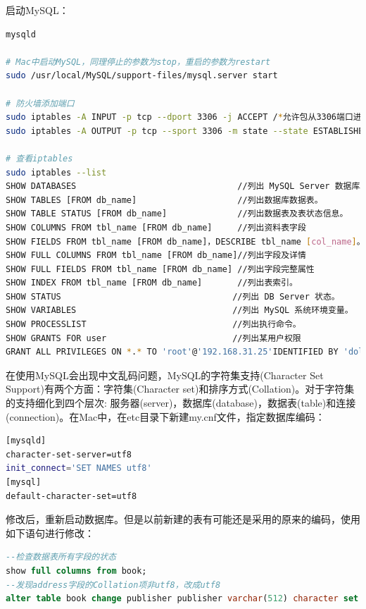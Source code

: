 \documentclass[letter]{book}
\begin{document}
启动MySQL：

\begin{lstlisting}[language=Bash]
mysqld

# Mac中启动MySQL，同理停止的参数为stop，重启的参数为restart
sudo /usr/local/MySQL/support-files/mysql.server start

# 防火墙添加端口
sudo iptables -A INPUT -p tcp --dport 3306 -j ACCEPT /*允许包从3306端口进入*/
sudo iptables -A OUTPUT -p tcp --sport 3306 -m state --state ESTABLISHED -j ACCEPT /*允许从3306端口进入的包返回*/

# 查看iptables
sudo iptables --list
SHOW DATABASES                                //列出 MySQL Server 数据库。
SHOW TABLES [FROM db_name]                    //列出数据库数据表。
SHOW TABLE STATUS [FROM db_name]              //列出数据表及表状态信息。
SHOW COLUMNS FROM tbl_name [FROM db_name]     //列出资料表字段
SHOW FIELDS FROM tbl_name [FROM db_name]，DESCRIBE tbl_name [col_name]。
SHOW FULL COLUMNS FROM tbl_name [FROM db_name]//列出字段及详情
SHOW FULL FIELDS FROM tbl_name [FROM db_name] //列出字段完整属性
SHOW INDEX FROM tbl_name [FROM db_name]       //列出表索引。
SHOW STATUS                                  //列出 DB Server 状态。
SHOW VARIABLES                               //列出 MySQL 系统环境变量。
SHOW PROCESSLIST                             //列出执行命令。
SHOW GRANTS FOR user                         //列出某用户权限
GRANT ALL PRIVILEGES ON *.* TO 'root'@'192.168.31.25'IDENTIFIED BY 'dolphin' WITH GRANT OPTION;
\end{lstlisting}

在使用MySQL会出现中文乱码问题，MySQL的字符集支持(Character Set Support)有两个方面：字符集(Character set)和排序方式(Collation)。对于字符集的支持细化到四个层次: 服务器(server)，数据库(database)，数据表(table)和连接(connection)。在Mac中，在etc目录下新建my.cnf文件，指定数据库编码：

\begin{lstlisting}[language=Bash]
[mysqld]
character-set-server=utf8
init_connect='SET NAMES utf8'
[mysql]
default-character-set=utf8
\end{lstlisting}

修改后，重新启动数据库。但是以前新建的表有可能还是采用的原来的编码，使用如下语句进行修改：

\begin{lstlisting}[language=SQL]
--检查数据表所有字段的状态	
show full columns from book; 
--发现address字段的Collation项非utf8，改成utf8
alter table book change publisher publisher varchar(512) character set utf8 collate utf8_unicode_ci not null;
\end{lstlisting}
\end{document}
